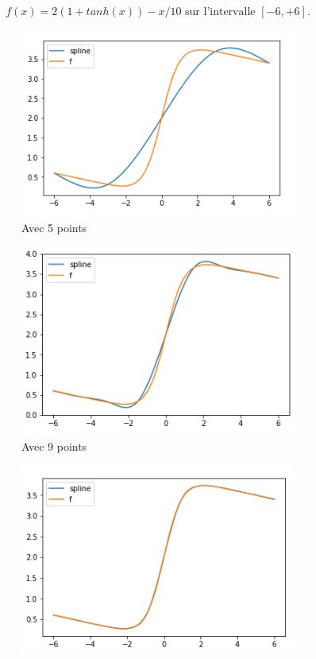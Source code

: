 \[ f(x) = 2(1 + tanh(x)) - x/10 \text{ sur l'intervalle } [-6,+6]\text{.} \]
\begin{figure}[h]
  \centering
  \begin{subfigure}[b]{0.4\linewidth}
    \includegraphics[width=\linewidth]{fig5}
    \caption{Avec 5 points}
  \end{subfigure}
  \begin{subfigure}[b]{0.4\linewidth}
    \includegraphics[width=\linewidth]{fig6}
    \caption{Avec 9 points}
  \end{subfigure}
  \begin{subfigure}[b]{0.4\linewidth}
    \includegraphics[width=\linewidth]{fig7}

\end{subfigure}
\end{figure}
